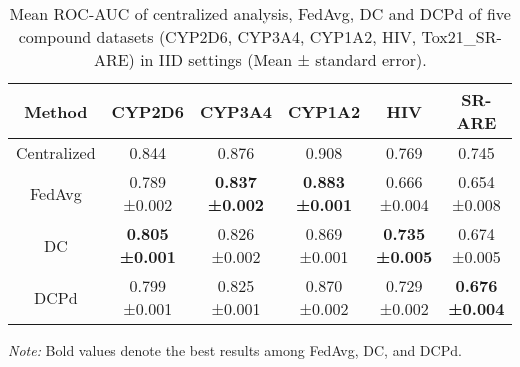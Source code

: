 \documentclass{article}
\begin{document}
\begin{table}[htbp]
\centering
\caption{Parameters of federated averaging used in this study.}
  \label{tab:Table 5}
\end{table}

\begin{table}[htbp]
\centering
\begin{threeparttable}
\caption{Mean ROC-AUC of centralized analysis, FedAvg, DC and DCPd of five compound datasets (CYP2D6, CYP3A4, CYP1A2, HIV, Tox21\_SR-ARE) in IID settings (Mean ± standard error).}
  \label{tab:Table 5}
  
  \begin{tabular}{cccccc}
    \hline
Method & CYP2D6 & CYP3A4 & CYP1A2 & HIV & SR-ARE \\ 
    \hline
Centralized & 0.844 & 0.876 & 0.908 & 0.769 & 0.745\\ 
FedAvg & \makecell{0.789 \\ ±0.002} & \makecell{\textbf{0.837} \\ \textbf{±0.002}} & \makecell{\textbf{0.883} \\ \textbf{±0.001}} & \makecell{0.666 \\ ±0.004} & \makecell{0.654 \\ ±0.008} \\ 
DC & \makecell{\textbf{0.805} \\ \textbf{±0.001}} & \makecell{0.826 \\ ±0.002} & \makecell{0.869 \\ ±0.001} & \makecell{\textbf{0.735} \\ \textbf{±0.005}} & \makecell{0.674 \\ ±0.005} \\ 
DCPd & \makecell{0.799 \\ ±0.001} & \makecell{0.825 \\ ±0.001} & \makecell{0.870 \\ ±0.002} & \makecell{0.729 \\ ±0.002} & \makecell{\textbf{0.676} \\ \textbf{±0.004}} \\ 
    \hline
    \end{tabular}
\begin{tablenotes}
      \small
      \item \textit{Note:} Bold values denote the best results among FedAvg, DC, and DCPd.
\end{tablenotes}
\end{threeparttable}
\end{table}
\end{document}
